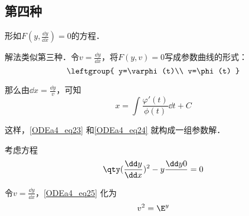 \subsection{第四种}

形如$F(y, \frac{\dd y}{\dd x})=0$的方程．

解法类似第三种．令$v=\frac{\dd y}{\dd x}$，将$F(y, v)=0$写成参数曲线的形式：
\begin{equation}\label{ODEa4_eq23}
\leftgroup{
    y=\varphi(t)\\
    v=\phi(t)
}
\end{equation}

那么由$\dd x=\frac{\dd y}{v}$，可知
\begin{equation}\label{ODEa4_eq24}
x=\int \frac{\varphi'(t)}{\phi(t)}\dd t+C
\end{equation}

这样，\autoref{ODEa4_eq23} 和\autoref{ODEa4_eq24} 就构成一组参数解．

\begin{example}{}
考虑方程
\begin{equation}\label{ODEa4_eq25}
\qty(\frac{\dd y}{\dd x})^2-y\frac{\dd y0}{}=0
\end{equation}

令$v=\frac{\dd y}{\dd x}$，\autoref{ODEa4_eq25} 化为
\begin{equation}
v^2=\E^y
\end{equation}
\end{example}











